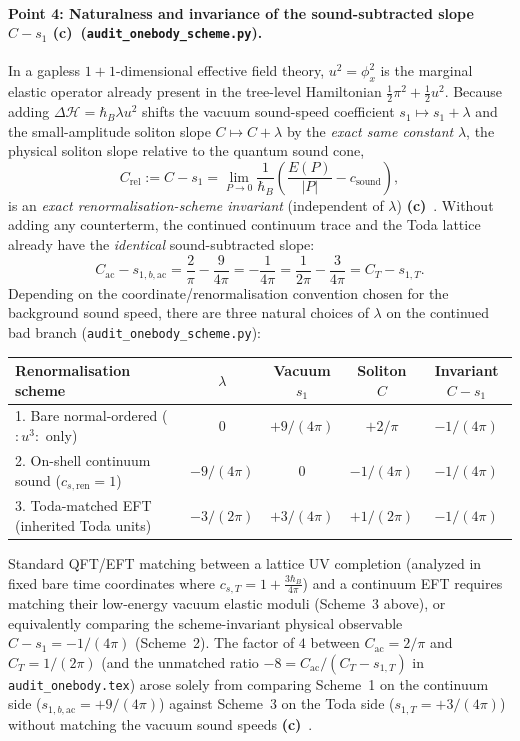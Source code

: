 \documentclass[11pt,a4paper]{article}
\newcommand{\Lc}{\textbf{(c)}\ }
\newcommand{\scr}{\texttt{audit\_\allowbreak onebody\_\allowbreak scheme.py}}
\begin{document}
\paragraph{Point 4: Naturalness and invariance of the sound-subtracted slope $C - s_1$ \Lc (\scr).}
In a gapless $1+1$-dimensional effective field theory, $u^2 = \phi_x^2$ is the marginal
elastic operator already present in the tree-level Hamiltonian $\frac{1}{2}\pi^2 + \frac{1}{2}u^2$.
Because adding $\Delta\mathcal{H} = \hbar_B\lambda u^2$ shifts the vacuum sound-speed
coefficient $s_1 \mapsto s_1 + \lambda$ and the small-amplitude soliton slope
$C \mapsto C + \lambda$ by the \emph{exact same constant} $\lambda$, the physical
soliton slope relative to the quantum sound cone,
\begin{equation}
  C_{\mathrm{rel}} := C - s_1 = \lim_{P\to 0}\frac{1}{\hbar_B}\left(\frac{E(P)}{|P|} - c_{\mathrm{sound}}\right),
\end{equation}
is an \emph{exact renormalisation-scheme invariant} (independent of $\lambda$) \Lc.
Without adding any counterterm, the continued continuum trace and the Toda lattice
already have the \emph{identical} sound-subtracted slope:
\begin{equation}
  C_{\mathrm{ac}} - s_{1,b,\mathrm{ac}} = \frac{2}{\pi} - \frac{9}{4\pi} = -\frac{1}{4\pi}
  = \frac{1}{2\pi} - \frac{3}{4\pi} = C_T - s_{1,T}.
  \label{eq:invariant}
\end{equation}
Depending on the coordinate/renormalisation convention chosen for the background sound speed,
there are three natural choices of $\lambda$ on the continued bad branch (\scr):
\begin{center}\footnotesize\setlength{\tabcolsep}{3.5pt}
\begin{tabular}{@{}lcccc@{}}
\toprule
Renormalisation scheme & $\lambda$ & Vacuum $s_1$ & Soliton $C$ & Invariant $C - s_1$ \\
\midrule
1. Bare normal-ordered ($:\!u^3\!:$ only) & $0$ & $+9/(4\pi)$ & $+2/\pi$ & $-1/(4\pi)$ \\
2. On-shell continuum sound ($c_{s,\mathrm{ren}}=1$) & $-9/(4\pi)$ & $0$ & $-1/(4\pi)$ & $-1/(4\pi)$ \\
3. Toda-matched EFT (inherited Toda units) & $-3/(2\pi)$ & $+3/(4\pi)$ & $+1/(2\pi)$ & $-1/(4\pi)$ \\
\bottomrule
\end{tabular}
\end{center}
Standard QFT/EFT matching between a lattice UV completion (analyzed in fixed bare
time coordinates where $c_{s,T} = 1 + \frac{3\hbar_B}{4\pi}$) and a continuum EFT
requires matching their low-energy vacuum elastic moduli (Scheme~3 above), or
equivalently comparing the scheme-invariant physical observable $C - s_1 = -1/(4\pi)$
(Scheme~2). The factor of $4$ between $C_{\mathrm{ac}} = 2/\pi$ and $C_T = 1/(2\pi)$
(and the unmatched ratio $-8 = C_{\mathrm{ac}}/(C_T - s_{1,T})$ in \texttt{audit\_\allowbreak onebody.tex})
arose solely from comparing Scheme~1 on the continuum side ($s_{1,b,\mathrm{ac}} = +9/(4\pi)$)
against Scheme~3 on the Toda side ($s_{1,T} = +3/(4\pi)$) without matching the vacuum sound
speeds \Lc.
\end{document}
